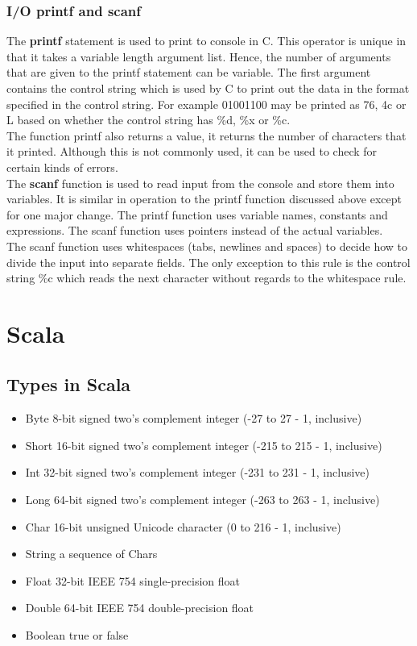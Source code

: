 \documentclass[11pt,a4paper,oneside]{book}
\begin{document}
\section{I/O printf and scanf}
The \textbf{printf} statement is used to print to console in C. This operator is unique in that it takes a
variable length argument list. Hence, the number of arguments that are given to the printf statement can be
variable. The first argument contains the control string which is used by C to print out the data in the
format specified in the control string. For example 01001100 may be printed as 76, 4c or L based on whether
the control string has \%d, \%x or \%c.\\

\noindent The function printf also returns a value, it returns the number of characters that it printed. Although
this is not commonly used, it can be used to check for certain kinds of errors.\\ 

\noindent The \textbf{scanf} function is used to read input from the console and store them into variables. It
is similar in operation to the printf function discussed above except for one major change. The printf function
uses variable names, constants and expressions. The scanf function uses pointers instead of the actual variables.\\

\noindent The scanf function uses whitespaces (tabs, newlines and spaces) to decide how to divide the input into
separate fields. The only exception to this rule is the control string \%c which reads the next character without
regards to the whitespace rule.

\part{Scala}
\setcounter{chapter}{0}
\chapter{Types in Scala}
\begin{itemize}
\itemsep-3pt
\item  Byte        8-bit signed two's complement integer (-27 to 27 - 1, inclusive)
\item  Short       16-bit signed two's complement integer (-215 to 215 - 1, inclusive)
\item Int         32-bit signed two's complement integer (-231 to 231 - 1, inclusive)        
\item Long        64-bit signed two's complement integer (-263 to 263 - 1, inclusive)
\item Char        16-bit unsigned Unicode character (0 to 216 - 1, inclusive)        
\item String        a sequence of Chars        
\item Float        32-bit IEEE 754 single-precision float
\item Double        64-bit IEEE 754 double-precision float        
\item Boolean        true or false
\end{itemize} 
\end{document}
